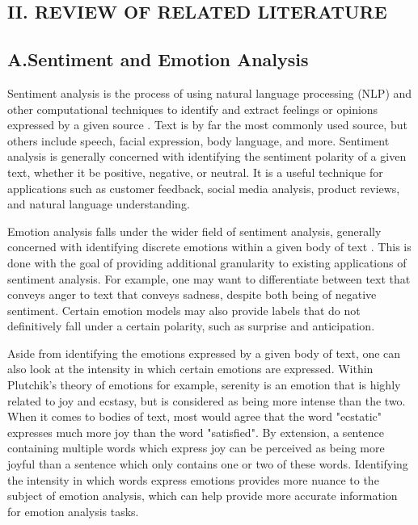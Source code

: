 \documentclass{icsthesis}
\begin{document}
\begin{mainmatter}
		\section{II. REVIEW OF RELATED LITERATURE}
            \subsection{A.\hspace{0.5cm}Sentiment and Emotion Analysis}
                Sentiment analysis is the process of using natural language processing (NLP) and other computational techniques to identify and extract feelings or opinions expressed by a given source \citep{Wankhade1}. Text is by far the most commonly used source, but others include speech, facial expression, body language, and more. Sentiment analysis is generally concerned with identifying the sentiment polarity of a given text, whether it be positive, negative, or neutral. It is a useful technique for applications such as customer feedback, social media analysis, product reviews, and natural language understanding.
                
                Emotion analysis falls under the wider field of sentiment analysis, generally concerned with identifying discrete emotions within a given body of text \citep{Yadollahi1}. This is done with the goal of providing additional granularity to existing applications of sentiment analysis. For example, one may want to differentiate between text that conveys anger to text that conveys sadness, despite both being of negative sentiment. Certain emotion models may also provide labels that do not definitively fall under a certain polarity, such as surprise and anticipation.
                
                Aside from identifying the emotions expressed by a given body of text, one can also look at the intensity in which certain emotions are expressed. Within Plutchik's theory of emotions \citep{Plutchik1} for example, serenity is an emotion that is highly related to joy and ecstasy, but is considered as being more intense than the two. When it comes to bodies of text, most would agree that the word "ecstatic" expresses much more joy than the word "satisfied". By extension, a sentence containing multiple words which express joy can be perceived as being more joyful than a sentence which only contains one or two of these words. Identifying the intensity in which words express emotions provides more nuance to the subject of emotion analysis, which can help provide more accurate information for emotion analysis tasks.
                

\end{mainmatter}
\end{document}

